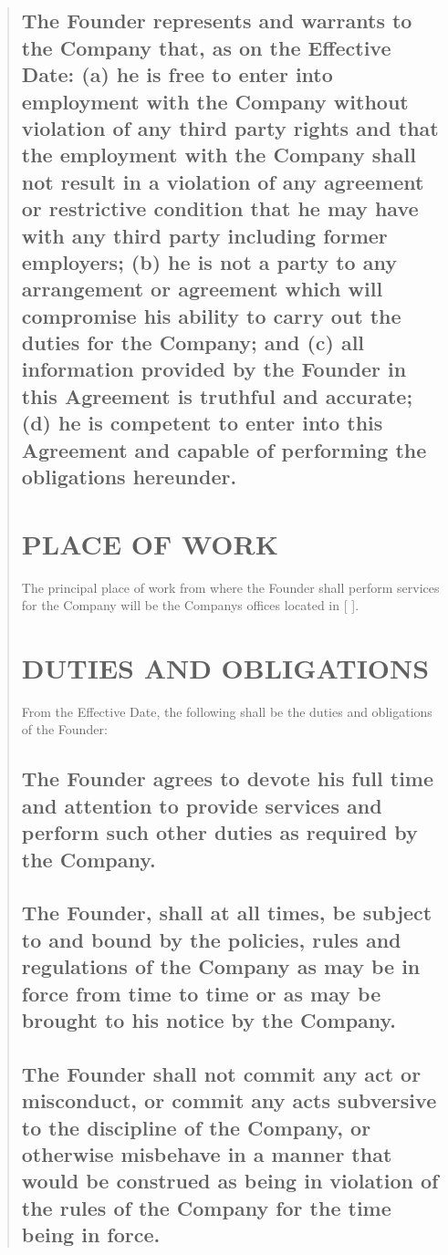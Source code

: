\documentclass[
]{article}
\begin{document}
\begin{quote}
\subsection{The Founder represents and warrants to the Company that, as on the Effective Date: (a) he is free to enter into employment with the Company without violation of any third party rights and that the employment with the Company shall not result in a violation of any agreement or restrictive condition that he may have with any third party including former employers; (b) he is not a party to any arrangement or agreement which will compromise his ability to carry out the duties for the Company; and (c) all information provided by the Founder in this Agreement is truthful and accurate; (d) he is competent to enter into this Agreement
and capable of performing the obligations hereunder.}

\section{PLACE OF WORK}

The principal place of work from where the Founder shall perform
services for the Company will be the Company\textquotesingle s offices
located in {[} {]}.

\section{DUTIES AND OBLIGATIONS}

From the Effective Date, the following shall be the duties and
obligations of the Founder:

\subsection{The Founder agrees to devote his full time and attention to provide services and perform such other duties as required by the Company.}

\subsection{The Founder, shall at all times, be subject to and bound by the policies, rules and regulations of the Company as may be in force from time to time or as may be brought to his notice by the Company.}

\subsection{The Founder shall not commit any act or misconduct, or commit any acts subversive to the discipline of the Company, or otherwise misbehave in a manner that would be construed as being in violation of the rules of the Company for the time being in force.}


\end{quote}
\end{document}
